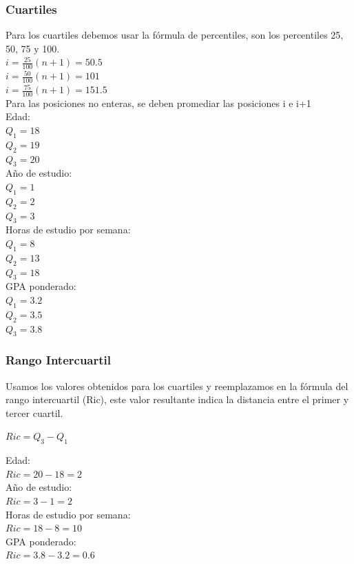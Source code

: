 \documentclass{article}
\begin{document}
\subsubsection*{Cuartiles}
Para los cuartiles debemos usar la fórmula de percentiles, son los percentiles 25, 50, 75 y 100.\\
$i = \frac{25}{100}(n+1)=50.5$ \\
$i = \frac{50}{100}(n+1)=101$ \\
$i = \frac{75}{100}(n+1)= 151.5$\vspace{0.25cm}\\
Para las posiciones no enteras, se deben promediar las posiciones i e i+1\\
Edad:\\                                          $Q_{1}= 18$\\$Q_{2}=19$\\$Q_{3}=20$\vspace{0.25cm}\\
Año de estudio: \\                          $Q_{1}= 1$\\$Q_{2}=2$\\$Q_{3}=3$\vspace{0.25cm}\\
Horas de estudio por semana:\\    $Q_{1}= 8$\\$Q_{2}=13$\\$Q_{3}=18$\vspace{0.25cm}\\
GPA ponderado:\\                          $Q_{1}= 3.2$\\$Q_{2}=3.5$\\$Q_{3}=3.8$\vspace{0.25cm}\\

\subsubsection*{Rango Intercuartil}
Usamos los valores obtenidos para los cuartiles y reemplazamos en la fórmula del rango intercuartil (Ric), este valor resultante indica la distancia entre el primer y tercer cuartil.\par
\begin{center}
$Ric = Q_{3}-Q_{1}$\\
\end{center}
Edad:\\                                          $Ric = 20-18 = 2$\vspace{0.25cm}\\
Año de estudio: \\                          $Ric = 3-1 = 2$\vspace{0.25cm}\\
Horas de estudio por semana:\\    $Ric = 18-8 = 10$\vspace{0.25cm}\\
GPA ponderado:\\                          $Ric = 3.8-3.2 = 0.6$\vspace{0.25cm}\\
\end{document}
